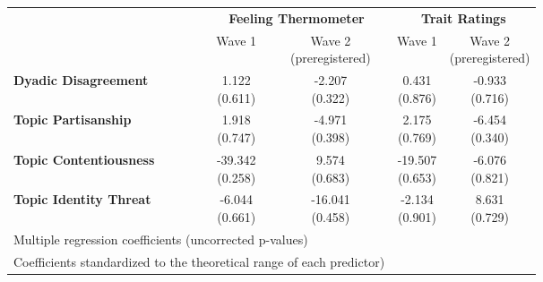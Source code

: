 \begin{tabular}{lcccc}
\hline
\multirow{2}{*}{~} & \multicolumn{2}{c}{\textbf{Feeling Thermometer}} & \multicolumn{2}{c}{\textbf{Trait Ratings}} \\
 & Wave 1 & \makecell{Wave 2 \\ (preregistered)} & Wave 1 & \makecell{Wave 2 \\ (preregistered)} \\
\hline

\textbf{Dyadic Disagreement} & \makecell{1.122 \\ (0.611)} & \makecell{-2.207 \\ (0.322)} & \makecell{0.431 \\ (0.876)} & \makecell{-0.933 \\ (0.716)} \\
\textbf{Topic Partisanship} & \makecell{1.918 \\ (0.747)} & \makecell{-4.971 \\ (0.398)} & \makecell{2.175 \\ (0.769)} & \makecell{-6.454 \\ (0.340)} \\
\textbf{Topic Contentiousness} & \makecell{-39.342 \\ (0.258)} & \makecell{9.574 \\ (0.683)} & \makecell{-19.507 \\ (0.653)} & \makecell{-6.076 \\ (0.821)} \\
\textbf{Topic Identity Threat} & \makecell{-6.044 \\ (0.661)} & \makecell{-16.041 \\ (0.458)} & \makecell{-2.134 \\ (0.901)} & \makecell{8.631 \\ (0.729)} \\
\hline

 \multicolumn{3}{l}{\footnotesize Multiple regression coefficients (uncorrected p-values)}\\
 \multicolumn{3}{l}{\footnotesize Coefficients standardized to the theoretical range of each predictor)}\\
 \hline
\end{tabular}

